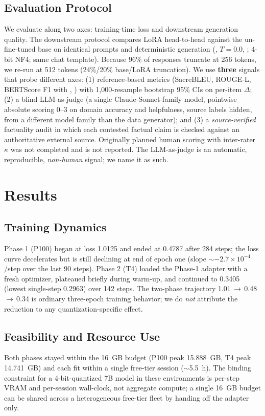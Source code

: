 \documentclass[11pt]{article}
\begin{document}
\subsection{Evaluation Protocol}
\begin{sloppypar}
We evaluate along two axes: training-time loss and downstream generation quality. The downstream protocol compares LoRA head-to-head against the un-fine-tuned base on identical prompts and deterministic generation (, $T=0.0$, ; 4-bit NF4; same chat template). Because 96\% of responses truncate at 256 tokens, we re-run at 512 tokens (24\%/20\% base/LoRA truncation). We use \textbf{three} signals that probe different axes: (1) reference-based metrics (SacreBLEU, ROUGE-L, BERTScore F1 with , ) with 1{,}000-resample bootstrap 95\% CIs on per-item $\Delta$; (2) a blind LLM-as-judge (a single Claude-Sonnet-family model, pointwise absolute scoring 0--3 on domain accuracy and helpfulness, source labels hidden, from a different model family than the data generator); and (3) a \emph{source-verified} factuality audit in which each contested factual claim is checked against an authoritative external source. Originally planned human scoring with inter-rater $\kappa$ was not completed and is not reported. The LLM-as-judge is an automatic, reproducible, \emph{non-human} signal; we name it as such.
\end{sloppypar}

\section{Results}
\subsection{Training Dynamics}
Phase 1 (P100) began at loss 1.0125 and ended at 0.4787 after 284 steps; the loss curve decelerates but is still declining at end of epoch one (slope $\sim{-}2.7{\times}10^{-4}$/step over the last 90 steps). Phase 2 (T4) loaded the Phase-1 adapter with a fresh optimizer, plateaued briefly during warm-up, and continued to 0.3405 (lowest single-step 0.2963) over 142 steps. The two-phase trajectory 1.01\,$\to$\,0.48\,$\to$\,0.34 is ordinary three-epoch training behavior; we do \emph{not} attribute the reduction to any quantization-specific effect.

\subsection{Feasibility and Resource Use}
Both phases stayed within the 16~GB budget (P100 peak 15.888~GB, T4 peak 14.741~GB) and each fit within a single free-tier session ($\sim$5.5~h). The binding constraint for a 4-bit-quantized 7B model in these environments is per-step VRAM and per-session wall-clock, not aggregate compute; a single 16~GB budget can be shared across a heterogeneous free-tier fleet by handing off the adapter only.
\end{document}
